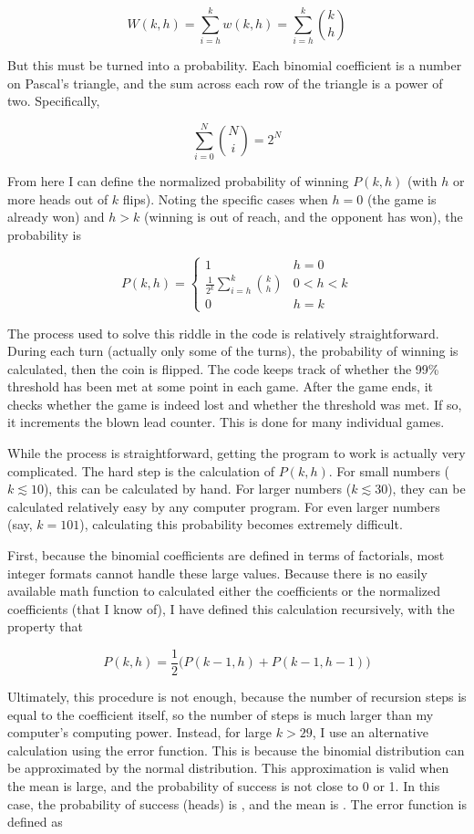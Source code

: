 \documentclass{article}
\begin{document}
\[
W(k,h)=\sum_{i=h}^{k}w(k,h)=\sum_{i=h}^{k}\binom{k}{h}
\]

But this must be turned into a probability.
Each binomial coefficient is a number on Pascal's triangle, and the sum across each row of the triangle is a power of two.
Specifically,

\[
\sum_{i=0}^{N}\binom{N}{i}=2^{N}
\]

From here I can define the normalized probability of winning $P(k,h)$ (with $h$ or more heads out of $k$ flips).
Noting the specific cases when $h=0$ (the game is already won) and $h>k$ (winning is out of reach, and the opponent has won), the probability is

\[
P(k,h)=
\begin{cases}
1                                         & h=0 \\
\displaystyle \frac{1}{2^{k}}\sum_{i=h}^{k}\binom{k}{h} & 0<h<k \\
0                                         & h=k
\end{cases}
\]

The process used to solve this riddle in the code is relatively straightforward.
During each turn (actually only some of the turns), the probability of winning is calculated, then the coin is flipped.
The code keeps track of whether the 99\% threshold has been met at some point in each game.
After the game ends, it checks whether the game is indeed lost and whether the threshold was met.
If so, it increments the blown lead counter.
This is done for many individual games.

While the process is straightforward, getting the program to work is actually very complicated.
The hard step is the calculation of $P(k,h)$.
For small numbers ($k\lesssim10$), this can be calculated by hand.
For larger numbers ($k\lesssim30$), they can be calculated relatively easy by any computer program.
For even larger numbers (say, $k=101$), calculating this probability becomes extremely difficult.

First, because the binomial coefficients are defined in terms of factorials, most integer formats cannot handle these large values.
Because there is no easily available math function to calculated either the coefficients or the normalized coefficients (that I know of), I have defined this calculation recursively, with the property that

\[
P(k,h)=\frac{1}{2}\big(P(k-1,h)+P(k-1,h-1)\big)
\]

Ultimately, this procedure is not enough, because the number of recursion steps is equal to the coefficient itself, so the number of steps is much larger than my computer's computing power.
Instead, for large $k>29$, I use an alternative calculation using the error function.
This is because the binomial distribution can be approximated by the normal distribution.
This approximation is valid when the mean is large, and the probability of success is not close to 0 or 1.
In this case, the probability of success (heads) is , and the mean is .
The error function is defined as
\end{document}
